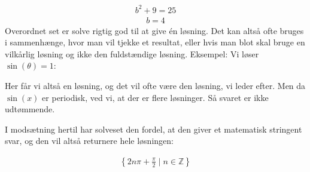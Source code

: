 \documentclass[letterpaper,10pt,english]{jupyterBook}
\begin{document}
\begin{sphinxVerbatim}[commandchars=\\\{\}]
  \PYG{p}{[}   \PYG{p}{]} 
\end{sphinxVerbatim}
\begin{equation*}
\begin{split}\displaystyle b^{2} + 9 = 25\end{split}
\end{equation*}\begin{equation*}
\begin{split}\displaystyle b = 4\end{split}
\end{equation*}
Overordnet set er solve rigtig god til at give én løsning. Det kan altså ofte bruges i sammenhænge, hvor man vil tjekke et resultat, eller hvis man blot skal bruge en vilkårlig løsning og ikke den fuldstændige løsning.
Eksempel: Vi løser \(\sin(\theta) = 1\):

\begin{sphinxVerbatim}[commandchars=\\\{\}]
  
\end{sphinxVerbatim}

\begin{sphinxVerbatim}[commandchars=\\\{\}]
[pi/2]
\end{sphinxVerbatim}

Her får vi altså en løsning, og det vil ofte være den løsning, vi leder efter. Men da \(\sin(x)\) er periodisk, ved vi, at der er flere løsninger. Så svaret er ikke udtømmende.

I modsætning hertil har solveset den fordel, at den giver et  matematisk stringent svar, og den vil altså returnere hele løsningen:

\begin{sphinxVerbatim}[commandchars=\\\{\}]
  
\end{sphinxVerbatim}
\begin{equation*}
\begin{split}\displaystyle \left\{2 n \pi + \frac{\pi}{2}\; |\; n \in \mathbb{Z}\right\}\end{split}
\end{equation*}
\end{document}
